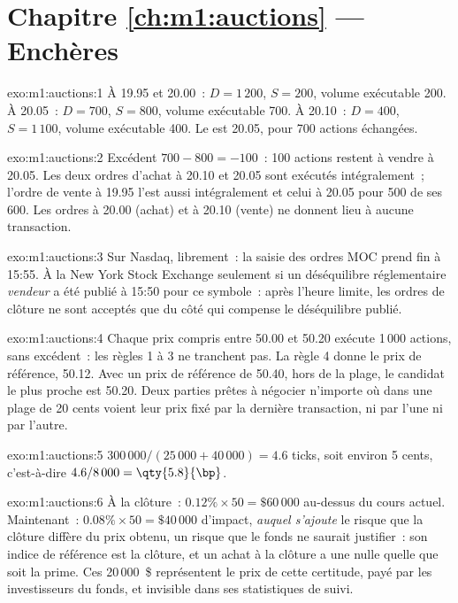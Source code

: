 \section*{Chapitre \ref{ch:m1:auctions} --- Enchères}

\begin{solution}{exo:m1:auctions:1}
À 19.95 et 20.00~: $D = 1\,200$, $S = 200$, volume exécutable 200. À 20.05~: $D =
700$, $S = 800$, volume exécutable 700. À 20.10~: $D = 400$, $S = 1\,100$,
volume exécutable 400. Le  est 20.05, pour 700 actions échangées.
\end{solution}

\begin{solution}{exo:m1:auctions:2}
Excédent $700 - 800 = -100$~: 100 actions restent à vendre à 20.05. Les deux
ordres d'achat à 20.10 et 20.05 sont exécutés intégralement~; l'ordre de vente à 19.95 l'est aussi intégralement
et celui à 20.05 pour 500 de ses 600. Les ordres à 20.00 (achat) et à 20.10
(vente) ne donnent lieu à aucune transaction.
\end{solution}

\begin{solution}{exo:m1:auctions:3}
Sur Nasdaq, librement~: la saisie des ordres MOC prend fin à 15:55. À la New York Stock Exchange
seulement si un déséquilibre réglementaire \emph{vendeur} a été publié à 15:50 pour ce
symbole~: après l'heure limite, les ordres de clôture ne sont acceptés que du côté
qui compense le déséquilibre publié.
\end{solution}

\begin{solution}{exo:m1:auctions:4}
Chaque prix compris entre 50.00 et 50.20 exécute 1\,000 actions, sans excédent~:
les règles 1 à 3 ne tranchent pas. La règle 4 donne le prix de référence, 50.12. Avec un
prix de référence de 50.40, hors de la plage, le candidat le plus proche est 50.20. Deux
parties prêtes à négocier n'importe où dans une plage de 20 cents voient leur prix fixé par la dernière
transaction, ni par l'une ni par l'autre.
\end{solution}

\begin{solution}{exo:m1:auctions:5}
$300\,000/(25\,000 + 40\,000) = 4.6$ ticks, soit environ 5 cents, c'est-à-dire
$4.6/8\,000 = \qty{5.8}{\bp}$.
\end{solution}

\begin{solution}{exo:m1:auctions:6}
À la clôture~: $0.12\% \times 50 = \$60\,000$ au-dessus du cours actuel. Maintenant~:
$0.08\% \times 50 = \$40\,000$ d'impact, \emph{auquel s'ajoute} le risque que la clôture
diffère du prix obtenu, un risque que le fonds ne saurait justifier~: son
indice de référence est la clôture, et un achat à la clôture a une  nulle
quelle que soit la prime. Ces 20\,000~\$ représentent le prix de cette certitude, payé par
les investisseurs du fonds, et invisible dans ses statistiques de suivi.
\end{solution}

